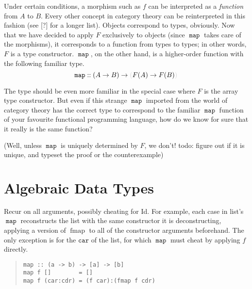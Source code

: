 \documentclass[proof]{article}
\newcommand{\map}{\ensuremath{\mathop{\mathtt{map}}}}
\newcommand{\fmap}{\mathop{\mathrm{fmap}}}
\newenvironment{indented}%
{\vspace{-2\bigskipamount}\begin{quotation}\noindent}%
{\end{quotation}}
\begin{document}
\begin{multicols}{2}
Under certain conditions, a morphism such as $f$ can be interpreted as a \emph{function} from $A$ to $B$. Every other concept in category theory can be reinterpreted in this fashion (see [?] for a longer list). Objects correspond to types, obviously. Now that we have decided to apply $F$ exclusively to objects (since $\map$ takes care of the morphisms), it corresponds to a function from types to types; in other words, $F$ is a type constructor. $\map$, on the other hand, is a higher-order function with the following familiar type.
\begin{equation}\label{map}
\map :: (A \rightarrow B) \rightarrow \textcolor{gray}{(}F(A) \rightarrow F(B)\textcolor{gray}{)}
\end{equation}

The type should be even more familiar in the special case where $F$ is the array type constructor. But even if this strange $\map$ imported from the world of category theory has the correct type to correspond to the familiar $\map$ function of your favourite functional programming language, how do we know for sure that it really is the same function?

(Well, unless $\map$ is uniquely determined by $F$, we don't! todo: figure out if it is unique, and typeset the proof or the counterexample)

\section{Algebraic Data Types}\label{simple}
Recur on all arguments, possibly cheating for Id. For example, each case in list's $\map$ reconstructs the list with the same constructor it is deconstructing, applying a version of $\fmap$ to all of the constructor arguments beforehand. The only exception is for the $\texttt{car}$ of the list, for which $\map$ must cheat by applying $f$ directly.
\begin{indented}
\begin{verbatim}
map :: (a -> b) -> [a] -> [b]
map f []        = []
map f (car:cdr) = (f car):(fmap f cdr)
\end{verbatim}
\end{indented}


\end{multicols}
\end{document}
